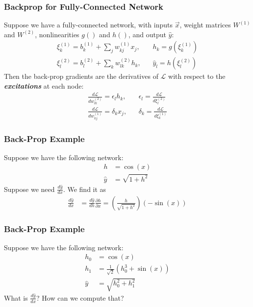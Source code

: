 \documentclass{beamer}
\begin{document}
\begin{frame}
  \frametitle{Backprop for Fully-Connected Network}

  Suppose we have a fully-connected network, with inputs $\vec{x}$,
  weight matrices $W^{(1)}$ and $W^{(2)}$, nonlinearities $g()$ and
  $h()$, and output $\hat{y}$:
  \begin{align*}
    \xi_k^{(1)} = b_{k}^{(1)}+\sum_j w_{kj}^{(1)} x_j,&~~~~
    h_k = g\left(\xi_k^{(1)}\right)\\
    \xi_l^{(2)} = b_{l}^{(2)}+\sum_k w_{lk}^{(2)} h_k,&~~~~
    \hat{y}_l = h\left(\xi_l^{(2)}\right)
  \end{align*}
  Then the back-prop gradients are the derivatives of ${\mathcal L}$ with respect
  to the {\bf\em excitations} at each node:
  \begin{align*}
    \frac{d{\mathcal L}}{dw_{lk}^{(2)}} =\epsilon_lh_k,&~~~~\epsilon_l=\frac{d{\mathcal L}}{d\xi_l^{(2)}}\\
      \frac{d{\mathcal L}}{dw_{kj}^{(1)}}=\delta_kx_j,&~~~~\delta_k=\frac{d{\mathcal L}}{d\xi_k^{(1)}}
  \end{align*}
\end{frame}

\begin{frame}
  \frametitle{Back-Prop Example}

  Suppose we have the following network:
  \begin{align*}
    h &= \cos(x)\\
    \hat{y} &= \sqrt{1+h^2}
  \end{align*}
  Suppose we need $\frac{d\hat{y}}{dx}$.  We find it as
  \begin{align*}
    \frac{d\hat{y}}{dx} &= \frac{d\hat{y}}{dh}\frac{\partial h}{\partial x}
    = \left(\frac{h}{\sqrt{1+h^2}}\right)\left(-\sin(x)\right)
  \end{align*}    
\end{frame}

\begin{frame}
  \frametitle{Back-Prop Example}

  Suppose we have the following network:
  \begin{align*}
    h_0 &= \cos(x)\\
    h_1 &= \frac{1}{\sqrt{2}}\left(h_0^3+\sin(x)\right)\\
    \hat{y} &= \sqrt{h_0^2+h_1^2}
  \end{align*}
  What  is $\frac{d\hat{y}}{dx}$?  How can we compute that?
\end{frame}
\end{document}

